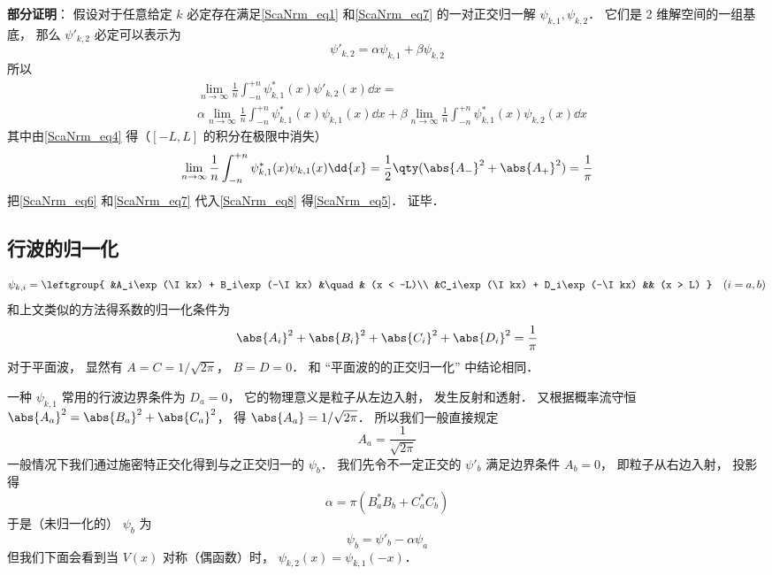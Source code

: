 \textbf{部分证明}： 假设对于任意给定 $k$ 必定存在满足\autoref{ScaNrm_eq1} 和\autoref{ScaNrm_eq7} 的一对正交归一解 $\psi_{k,1}, \psi_{k,2}$． 它们是 2 维解空间的一组基底， 那么 $\psi'_{k,2}$ 必定可以表示为
\begin{equation}
\psi'_{k,2} = \alpha\psi_{k,1} + \beta\psi_{k,2}
\end{equation}
所以
\begin{equation}\label{ScaNrm_eq8}
\begin{aligned}
&\lim_{n\to\infty}\frac{1}{n}\int_{-n}^{+n} \psi_{k,1}^*(x)\psi'_{k,2}(x)\dd{x}
=\\
&\alpha\lim_{n\to\infty}\frac{1}{n}\int_{-n}^{+n} \psi_{k,1}^*(x)\psi_{k,1}(x)\dd{x}
+ \beta\lim_{n\to\infty}\frac{1}{n}\int_{-n}^{+n} \psi_{k,1}^*(x)\psi_{k,2}(x)\dd{x}
\end{aligned}
\end{equation}
其中由\autoref{ScaNrm_eq4} 得（$[-L,L]$ 的积分在极限中消失）
\begin{equation}\label{ScaNrm_eq6}
\lim_{n\to\infty}\frac{1}{n}\int_{-n}^{+n} \psi_{k,1}^*(x)\psi_{k,1}(x)\dd{x} = \frac{1}{2}\qty(\abs{A_-}^2 + \abs{A_+}^2) = \frac{1}{\pi}
\end{equation}
把\autoref{ScaNrm_eq6} 和\autoref{ScaNrm_eq7} 代入\autoref{ScaNrm_eq8} 得\autoref{ScaNrm_eq5}． 证毕．

\subsection{行波的归一化}

\begin{equation}
\psi_{k,i} = \leftgroup{
    &A_i\exp(\I kx) + B_i\exp(-\I kx) &\quad& (x < -L)\\
    &C_i\exp(\I kx) + D_i\exp(-\I kx) && (x > L)
} \quad (i = a,b)
\end{equation}
和上文类似的方法得系数的归一化条件为
\begin{equation}
\abs{A_i}^2 + \abs{B_i}^2 + \abs{C_i}^2 + \abs{D_i}^2= \frac{1}{\pi}
\end{equation}
对于平面波， 显然有 $A = C = 1/\sqrt{2\pi}$， $B = D = 0$． 和 “平面波的的正交归一化” 中结论相同．

一种 $\psi_{k,1}$ 常用的行波边界条件为 $D_a = 0$， 它的物理意义是粒子从左边入射， 发生反射和透射． 又根据概率流守恒 $\abs{A_a}^2 = \abs{B_a}^2 + \abs{C_a}^2$， 得 $\abs{A_a} = 1/\sqrt{2\pi}$． 所以我们一般直接规定
\begin{equation}\label{ScaNrm_eq10}
A_a = \frac{1}{\sqrt{2\pi}}
\end{equation}
一般情况下我们通过施密特正交化得到与之正交归一的 $\psi_b$． 我们先令不一定正交的 $\psi'_b$ 满足边界条件 $A_b = 0$， 即粒子从右边入射， 投影得
\begin{equation}
\alpha = \pi (B_a^* B_b + C_a^*C_b)
\end{equation}
于是（未归一化的） $\psi_b$ 为
\begin{equation}
\psi_b = \psi'_b - \alpha \psi_a
\end{equation}
但我们下面会看到当 $V(x)$ 对称（偶函数）时， $\psi_{k,2}(x) = \psi_{k,1}(-x)$．

